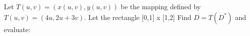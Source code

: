 Let $T(u, v) = (x(u, v), y(u, v))$ be the mapping defined by $T(u, v) = (4u, 2u+3v).$ Let the rectangle [0,1] x [1,2]
Find $D = T(D^*)$ and evaluate: 
